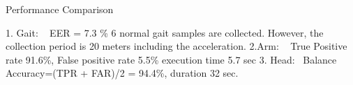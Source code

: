 Performance Comparison

1. Gait: ~\cite{gafurov2006biometric} EER  = 7.3 \% 6 normal gait samples are collected. However, the collection period is 20 meters including the acceleration. 
2.Arm: ~\cite{ahmed2015checksum} True Positive rate 91.6\%, False positive rate 5.5\%    execution time 5.7 sec
3. Head:~\cite{rogers2015approach} Balance Accuracy=(TPR + FAR)/2 = 94.4\%, duration 32 sec.

